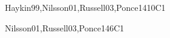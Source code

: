 \begin{syllabus}
\begin{unit}{\ISBasicMachineLearning}{}{Haykin99,Nilsson01,Russell03,Ponce14}{10}{C1}
\begin{topics}
    \item \ISBasicMachineLearningTopicDefinition
    \item \ISBasicMachineLearningTopicInductive
    \item \ISBasicMachineLearningTopicSimple
    \item \ISBasicMachineLearningTopicThe
    \item \ISBasicMachineLearningTopicMeasuring
\end{topics}
\begin{learningoutcomes}
    \item \ISBasicMachineLearningLOListThe [\Usage]
    \item \ISBasicMachineLearningLOIdentifyExamples [\Usage]
    \item \ISBasicMachineLearningLOExplainTheInductive [\Usage]
    \item \ISBasicMachineLearningLODescribeOver [\Usage]
    \item \ISBasicMachineLearningLOApplyTheLearning [\Usage]
\end{learningoutcomes}
\end{unit}

\begin{unit}{\ISRobotics}{}{Nilsson01,Russell03,Ponce14}{6}{C1}
\begin{topics}
    \item \ISRoboticsTopicOverview
    \item \ISRoboticsTopicConfiguration
    \item \ISRoboticsTopicInterpreting
    \item \ISRoboticsTopicLocalizing
    \item \ISRoboticsTopicNavigation
    \item \ISRoboticsTopicMotion
    \item \ISRoboticsTopicMultiple
\end{topics}
\begin{learningoutcomes}
    \item \ISRoboticsLOListCapabilities [\Usage]
    \item \ISRoboticsLOIntegrate [\Usage]
    \item \ISRoboticsLOProgram [\Usage]
    \item \ISRoboticsLOImplementFundamental [\Usage]
    \item \ISRoboticsLOCharacterizeTheWith [\Usage]
    \item \ISRoboticsLOListTheRobots [\Usage]
    \item \ISRoboticsLOCompareAndLeast [\Usage]
    \item \ISRoboticsLODescribeAt [\Usage]
\end{learningoutcomes}
\end{unit}


\end{syllabus}
